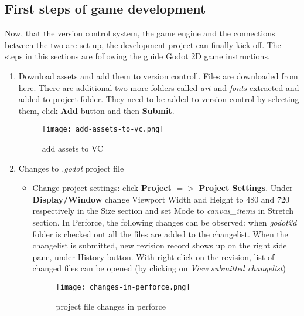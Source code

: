 \subsection{First steps of game development}
Now, that the version control system, the game engine and the connections between the two are set up, the
development project can finally kick off. The steps in this sections are following the guide 
\href{https://docs.godotengine.org/en/stable/getting_started/first_2d_game/index.html}{\color{blue}Godot 2D game instructions}.
\begin{enumerate}
    \item Download assets and add them to version controll. Files are downloaded from 
    \href{https://github.com/godotengine/godot-docs-project-starters/releases/download/latest-4.x/dodge_the_creeps_2d_assets.zip}{\color{blue}here}.
    There are additional two more folders called \textit{art} and \textit{fonts} extracted and added to project folder.
    They need to be added to version control by selecting them, click \textbf{Add} button and then \textbf{Submit}.
    \begin{figure}[H]
        \centering
        \texttt{[image: add-assets-to-vc.png]}
          \caption{add assets to VC}
          \label{fig:add-assets-to-vc}
    \end{figure}
    \item Changes to \textit{.godot} project file
    \begin{itemize}
        \item Change project settings: click \textbf{Project} {$=>$} \textbf{Project Settings}. Under \textbf{Display/Window}
        change Viewport Width and Height to 480 and 720 respectively in the Size section and set Mode to \textit{canvas\_items}
        in Stretch section. In Perforce, the following changes can be observed: when \textit{godot2d} folder is checked out
        all the files are added to the changelist. When the changelist is submitted, new revision record shows up on the 
        right side pane, under History button. With right click on the revision, list of changed files can be opened (by
        clicking on \textit{View submitted changelist}) 
        \begin{figure}[H]
            \centering
            \texttt{[image: changes-in-perforce.png]}
              \caption{project file changes in perforce}
              \label{fig:changes-in-perforce}
        \end{figure}
    \end{itemize}

\end{enumerate}
